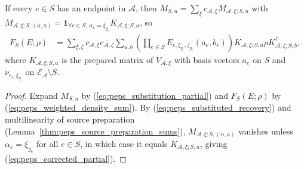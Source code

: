 \begin{lemma}
    \label{thm:peps_corrected_partial}
    \leanok
    If every $e\in S$ has an endpoint in $\mathcal A$, then
    $M_{S,u}=\sum_\xi c_{\mathcal A,\xi}M_{\mathcal A,\xi;S,u}$ with
    $M_{\mathcal A,\xi;S,(\alpha,a)}=\mathbf 1_{\forall e\in S,\,\alpha_e=\xi_{g_e}}K_{\mathcal A,\xi;S,a}$,
    so
    \begin{align}
        F_S(E;\rho)
         & =\sum_{\xi,\zeta}c_{\mathcal A,\xi}\overline{c_{\mathcal A,\zeta}}
        \sum_{a,b}
        \left(\prod_{e\in S}
        E_{e,\xi_{g_e},\zeta_{g_e}}(a_e,b_e)\right)
        K_{\mathcal A,\xi;S,a}\rho K_{\mathcal A,\zeta;S,b}^{\dagger},
        \label{eq:peps_corrected_partial}
    \end{align}
    where $K_{\mathcal A,\xi;S,a}$ is the prepared matrix of
    $V_{\mathcal A,\xi}$ with basis vectors $a_e$ on $S$ and $\nu_{e_i,\xi_{g_i}}$
    on $\mathcal E_{\mathcal A}\setminus S$.
\end{lemma}

\begin{proof}
    \leanok
    Expand $M_{S,u}$ by (\ref{eq:peps_substitution_partial}) and $F_S(E;\rho)$
    by (\ref{eq:peps_weighted_density_sum}). By
    (\ref{eq:peps_substituted_recovery}) and multilinearity of source
    preparation (Lemma~\ref{thm:peps_source_preparation_sums}),
    $M_{\mathcal A,\xi;S,(\alpha,a)}$ vanishes unless $\alpha_e=\xi_{g_e}$ for
    all $e\in S$, in which case it equals $K_{\mathcal A,\xi;S,a}$, giving
    (\ref{eq:peps_corrected_partial}).
\end{proof}

